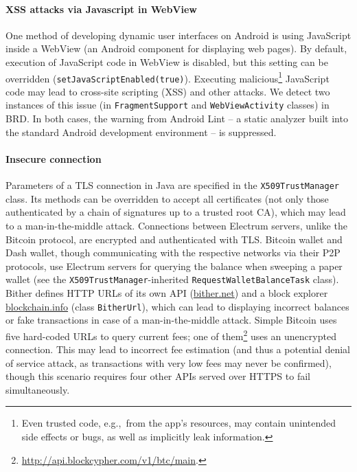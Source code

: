 \paragraph{XSS attacks via Javascript in WebView}
One method of developing dynamic user interfaces on Android is using JavaScript inside a WebView (an Android component for displaying web pages).
By default, execution of JavaScript code in WebView is disabled, but this setting can be overridden (\texttt{setJavaScriptEnabled(true)}).
Executing malicious\footnote{Even trusted code, e.g.,~from the app's resources, may contain unintended side effects or bugs, as well as implicitly leak information.} JavaScript code may lead to cross-site scripting (XSS) and other attacks.
We detect two instances of this issue (in \texttt{FragmentSupport} and \texttt{WebViewActivity} classes) in BRD.
In both cases, the warning from Android Lint -- a static analyzer built into the standard Android development environment -- is suppressed.

\paragraph{Insecure connection}
Parameters of a TLS connection in Java are specified in the \texttt{X509TrustManager} class.
Its methods can be overridden to accept all certificates (not only those authenticated by a chain of signatures up to a trusted root CA), which may lead to a man-in-the-middle attack.
Connections between Electrum servers, unlike the Bitcoin protocol, are encrypted and authenticated with TLS.
Bitcoin wallet and Dash wallet, though communicating with the respective networks via their P2P protocols, use Electrum servers for querying the balance when sweeping a paper wallet (see the \texttt{X509TrustManager}-inherited \texttt{RequestWalletBalanceTask} class).
Bither defines HTTP URLs of its own API (\url{bither.net}) and a block explorer \url{blockchain.info} (class \texttt{BitherUrl}), which can lead to displaying incorrect balances or fake transactions in case of a man-in-the-middle attack.
Simple Bitcoin uses five hard-coded URLs to query current fees; one of them\footnote{\url{http://api.blockcypher.com/v1/btc/main}.} uses an unencrypted connection.
This may lead to incorrect fee estimation (and thus a potential denial of service attack, as transactions with very low fees may never be confirmed), though this scenario requires four other APIs served over HTTPS to fail simultaneously.

